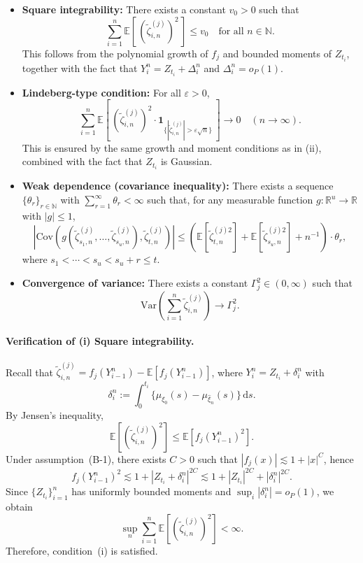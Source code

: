 \documentclass[a4paper,10pt,twoside]{article}
\numberwithin{equation}{section}
\def\l{\left}
\def\r{\right}
\def\E{\mathbb{E}}
\def\Var{\mathrm{Var}}
\def\Cov{\mathrm{Cov}}
\begin{document}
\begin{itemize}
\item[(i)] \textbf{Square integrability:}
There exists a constant $v_0 > 0$ such that
\[
\sum_{i=1}^n \E\l[\, (\widetilde{\zeta}_{i,n}^{(j)} )^2\, \r] \le v_0
\quad \text{for all } n \in \mathbb{N}.
\]
This follows from the polynomial growth of $f_j$ and bounded moments of $Z_{t_i}$, together with the fact that $Y_i^n = Z_{t_i} + \Delta_i^n$ and $\Delta_i^n = o_P(1)$.

\item[(ii)] \textbf{Lindeberg-type condition:}
For all $\varepsilon > 0$,
\[
\sum_{i=1}^n \E\l[\, (\widetilde{\zeta}_{i,n}^{(j)} )^2 \cdot \mathbf{1}_{\{ |\widetilde{\zeta}_{i,n}^{(j)} | > \varepsilon \sqrt{n} \}} \, \r] \to 0 \quad (n \to \infty).
\]
This is ensured by the same growth and moment conditions as in (ii), combined with the fact that $Z_{t_i}$ is Gaussian.

\item[(iii)] \textbf{Weak dependence (covariance inequality):}
There exists a sequence $\{\theta_r\}_{r\in \mathbb{N}}$ with $\sum_{r=1}^\infty \theta_r < \infty$ such that, for any measurable function $g : \mathbb{R}^u \to \mathbb{R}$ with $|g| \le 1$,
\[
\l| \Cov\l( g(\widetilde{\zeta}_{s_1,n}^{(j)},\dots,\widetilde{\zeta}_{s_u,n}^{(j)}), \widetilde{\zeta}_{t,n}^{(j)} \r) \r|
\le ( \E[\widetilde{\zeta}_{t,n}^{(j)2}] + \E[\widetilde{\zeta}_{s_u,n}^{(j)2}] + n^{-1} ) \cdot \theta_{r},
\]
where $s_1 < \cdots < s_u < s_u + r \le t$.
\item[(iv)] \textbf{Convergence of variance:}
There exists a constant $\Gamma_{j}^2 \in (0,\infty)$ such that
\[
\Var\l( \sum_{i=1}^n \widetilde{\zeta}_{i,n}^{(j)} \r) \to \Gamma_{j}^2.
\]
\end{itemize}

\paragraph{Verification of (i) Square integrability.}
Recall that $\widetilde{\zeta}_{i,n}^{(j)} = f_j(Y_{i-1}^n) - \E[f_j(Y_{i-1}^n)]$, where $Y_i^n = Z_{t_i} + \delta_i^n$ with 
\[
\delta_i^n := \int_0^{t_i} \{ \mu_{\xi_0}(s) - \mu_{\widehat{\xi}_n}(s) \} \, \mathrm{d}s.
\]
By Jensen's inequality,
\[
\E\l[ (\widetilde{\zeta}_{i,n}^{(j)} )^2 \r] \le \E\l[ f_j(Y_{i-1}^n)^2 \r].
\]
Under assumption~(B-1), there exists $C > 0$ such that $|f_j(x)| \lesssim 1 + |x|^C$, hence
\[
f_j(Y_{i-1}^n)^2 \lesssim 1 + |Z_{t_i} + \delta_i^n|^{2C} \lesssim 1 + |Z_{t_i}|^{2C} + |\delta_i^n|^{2C}.
\]
Since $\{Z_{t_i}\}_{i=1}^n$ has uniformly bounded moments and $\sup_i |\delta_i^n| = o_P(1)$, we obtain
\[
\sup_{n} \sum_{i=1}^n \E\l[ (\widetilde{\zeta}_{i,n}^{(j)} )^2 \r] < \infty.
\]
Therefore, condition~(i) is satisfied.
\end{document}
